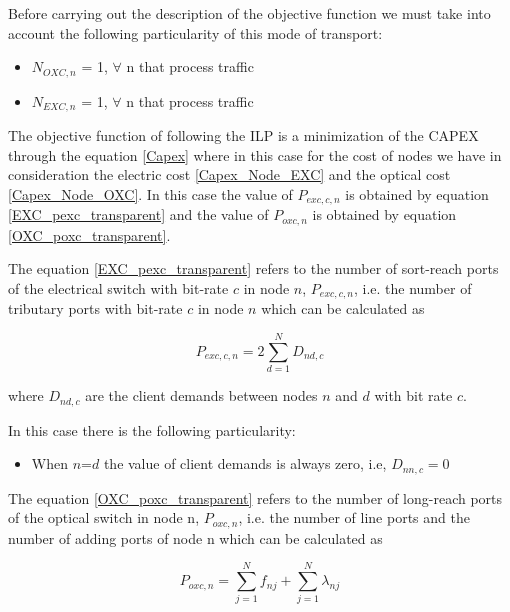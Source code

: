Before carrying out the description of the objective function we must take into account the following particularity of this mode of transport:
\begin{itemize}
  \item $N_{OXC,n}$ = 1, \quad $\forall$ n that process traffic
  \item $N_{EXC,n}$ = 1, \quad $\forall$ n that process traffic
\end{itemize}

\vspace{11pt}
The objective function of following the ILP is a minimization of the CAPEX through the equation \ref{Capex} where in this case for the cost of nodes we have in consideration the electric cost \ref{Capex_Node_EXC} and the optical cost \ref{Capex_Node_OXC}.
In this case the value of $P_{exc,c,n}$ is obtained by equation \ref{EXC_pexc_transparent} and the value of $P_{oxc,n}$ is obtained by equation \ref{OXC_poxc_transparent}.\\

\newpage

The equation \ref{EXC_pexc_transparent} refers to the number of sort-reach ports of the electrical switch with bit-rate $c$ in node $n$, $P_{exc,c,n}$, i.e. the number of tributary ports with bit-rate $c$ in node $n$ which can be calculated as

\begin{equation}
P_{exc,c,n} = 2 \sum_{d=1}^{N} D_{nd,c}
\label{EXC_pexc_transparent}
\end{equation}

\vspace{11pt}
where $D_{nd,c}$ are the client demands between nodes $n$ and $d$ with bit rate $c$.

\vspace{11pt}
In this case there is the following particularity:

\begin{itemize}
  \item When $n$=$d$ the value of client demands is always zero, i.e, $D_{nn,c}=0$
\end{itemize}

\vspace{11pt}
The equation \ref{OXC_poxc_transparent} refers to the number of long-reach ports of the optical switch in node n, $P_{oxc,n}$, i.e. the number of line ports and the number of adding ports of node n which can be calculated as

\begin{equation}
P_{oxc,n} = \sum_{j=1}^{N} f_{nj} + \sum_{j=1}^{N} \lambda_{nj}
\label{OXC_poxc_transparent}
\end{equation}


